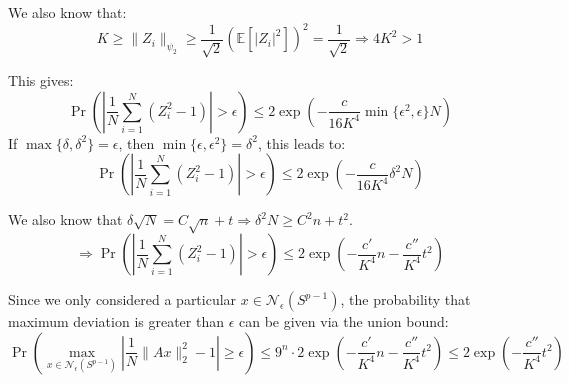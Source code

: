 \documentclass{article}
\theoremstyle{remark}
\newcommand{\Exp}{\mathbb{E}}
\newcommand{\calN}{\mathcal{N}}
\begin{document}
We also know that:
\begin{equation*}
K \geq \|Z_{i}\|_{\psi_{2}} \geq \frac{1}{\sqrt{2}}\left(\Exp[|Z_{i}|^{2}]\right)^{2} = \frac{1}{\sqrt{2}} \Rightarrow 4K^{2} > 1
\end{equation*}

This gives:
\begin{equation*}
\Pr\left(\left|\frac{1}{N}\sum_{i=1}^{N}(Z_{i}^{2} - 1)\right| > \epsilon\right) \leq 2\exp\left(-\frac{c}{16K^{4}}\min\{\epsilon^{2}, \epsilon\}N\right)
\end{equation*}
If \(\max\{\delta, \delta^{2}\} = \epsilon\), then \(\min\{\epsilon, \epsilon^{2}\} = \delta^{2}\), this leads to:
\begin{equation*}
\Pr\left(\left|\frac{1}{N}\sum_{i=1}^{N}(Z_{i}^{2} - 1)\right| > \epsilon\right) \leq 2\exp\left(-\frac{c}{16K^{4}}\delta^{2}N\right)
\end{equation*}

We also know that \(\delta\sqrt{N} = C\sqrt{n} + t \Rightarrow \delta^{2}N \geq C^{2}n + t^{2}\).
\begin{equation*}
\Rightarrow \Pr\left(\left|\frac{1}{N}\sum_{i=1}^{N}(Z_{i}^{2} - 1)\right| > \epsilon\right) \leq 2\exp\left(-\frac{c'}{K^{4}}n - \frac{c''}{K^{4}}t^{2}\right)
\end{equation*}

Since we only considered a particular \(x \in \calN_{\epsilon}(S^{p-1})\), the probability that maximum deviation is greater than \(\epsilon\) can be given via the union bound:
\begin{equation*}
\Pr\left(\max_{x \in \calN_{\epsilon}(S^{p-1})}\left|\frac{1}{N}\|Ax\|_{2}^{2} - 1\right| \geq \epsilon\right) \leq 9^{n}\cdot 2\exp\left(-\frac{c'}{K^{4}}n - \frac{c''}{K^{4}}t^{2}\right) \leq 2\exp\left(-\frac{c''}{K^{4}}t^{2}\right)
\end{equation*}
\end{document}
